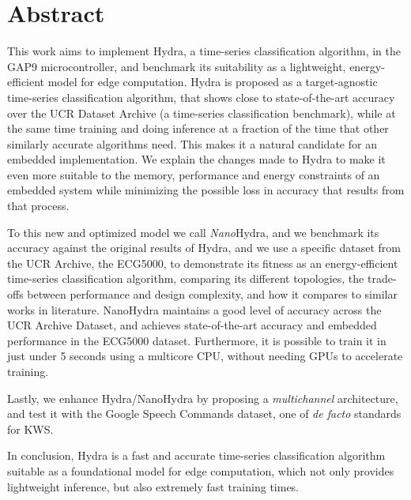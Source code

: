 \chapter*{Abstract}

This work aims to implement Hydra, a time-series classification algorithm, in the GAP9 microcontroller, and benchmark its suitability
as a lightweight, energy-efficient model for edge computation. Hydra is proposed as a target-agnostic time-series classification algorithm, that
shows close to state-of-the-art accuracy over the UCR Dataset Archive (a time-series classification benchmark), while at the same time training and 
doing inference at a fraction of the time that other similarly accurate algorithms need. This makes it a natural candidate for an embedded implementation.
We explain the changes made to Hydra to make it even more suitable to the memory, performance and energy constraints of an embedded system  while minimizing
the possible loss in accuracy that results from that process. 

To this new and optimized model we call \emph{Nano}Hydra, and we benchmark its accuracy against 
the original results of Hydra, and we use a specific dataset from the UCR Archive, the ECG5000, to demonstrate its fitness as an energy-efficient time-series classification
algorithm, comparing its different topologies, the trade-offs between performance and design complexity, and how it compares to similar works in literature.
NanoHydra maintains a good level of accuracy across the UCR Archive Dataset, and achieves state-of-the-art accuracy and embedded performance in the ECG5000 dataset. 
Furthermore, it is possible to train it in just under 5 seconds using a multicore CPU, without needing GPUs to accelerate training. 

Lastly, we enhance Hydra/NanoHydra by proposing a \emph{multichannel} architecture, and test it with the Google Speech Commands dataset, one of \emph{de facto} standards for KWS.

In conclusion, Hydra is a fast and accurate time-series classification algorithm suitable as a foundational model for edge computation, which not only provides lightweight inference, but also
extremely fast training times.


